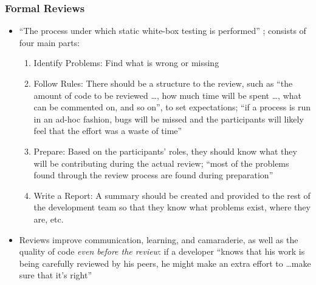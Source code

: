 \subsubsection{Formal Reviews \cite[p.~92-95]{patton_software_2006}}

\begin{itemize}
      \item ``The process under which static white-box testing is performed''
            \cite[p.~92]{patton_software_2006}; consists of four main parts:

            \begin{enumerate}
                  \item Identify Problems: Find what is wrong or missing
                  \item Follow Rules: There should be a structure to the review,
                        such as ``the amount of code to be reviewed \dots, how
                        much time will be spent \dots, what can be commented on,
                        and so on'', to set expectations; ``if a process is run
                        in an ad-hoc fashion, bugs will be missed and the
                        participants will likely feel that the effort was a
                        waste of time''
                  \item Prepare: Based on the participants' roles, they should
                        know what they will be contributing during the actual
                        review; ``most of the problems found through the review
                        process are found during preparation''
                  \item Write a Report: A summary should be created and provided
                        to the rest of the development team so that they know
                        what problems exist, where they are, etc.
                        \cite[p.~93]{patton_software_2006}
            \end{enumerate}

      \item Reviews improve communication, learning, and camaraderie, as well as
            the quality of code \emph{even before the review}: if a developer
            ``knows that his work is being carefully reviewed by his peers, he
            might make an extra effort to \dots make sure that it's right''
            \cite[p.~93-94]{patton_software_2006}


\end{itemize}
